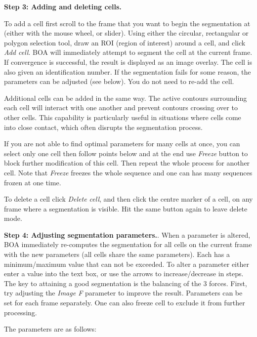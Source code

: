 \documentclass[a4paper,12pt]{article}
\begin{document}
\textbf{Step 3: Adding and deleting cells.} 

To add a cell first scroll to the frame that you want to begin the segmentation at (either with the mouse wheel, or slider).  Using either the
circular, rectangular or polygon selection tool, draw an ROI (region of interest) around a cell, and click \textit{Add cell}. 
BOA will immediately attempt to segment 
the cell at the current frame.  If convergence is successful, the result is displayed as an image overlay. The cell is also given an
identification number.
If the segmentation fails for some reason, the parameters can be adjusted (see below). You do not need to re-add the cell.

Additional cells can be added in the same way.   The active contours surrounding each cell will interact with one another and prevent
contours crossing over to other cells.  This capability is particularly useful in situations where cells come into close contact, 
which often disrupts the segmentation process.

If you are not able to find optimal parameters for many cells at once, you can select only one cell then follow points below and at the end use \textit{Freeze} button to block further modification of this cell. Then repeat the whole process for another cell. Note that \textit{Freeze} freezes the whole sequence and one can has many sequences frozen at one time.   

To delete a cell click \textit{Delete cell}, and then click the centre marker of a cell, on any frame where a segmentation is visible.  Hit the same 
button again to leave delete mode.

\textbf{Step 4: Adjusting segmentation parameters.}.\label{step4}  When a parameter is altered, BOA immediately re-computes the segmentation
for all cells on the current frame with the new parameters (all cells share the same parameters).  Each has a minimum/maximum
value that can not be exceeded.  To alter a parameter either enter a value into the text box, or use the arrows to increase/decrease in steps. The key to attaining a good segmentation is the balancing of the 3 forces.
First, try adjusting the \textit{Image F} parameter to improve the result. Parameters can be set for each frame separately. One can also freeze cell to exclude it from further processing.

The parameters are as follows:
\end{document}

